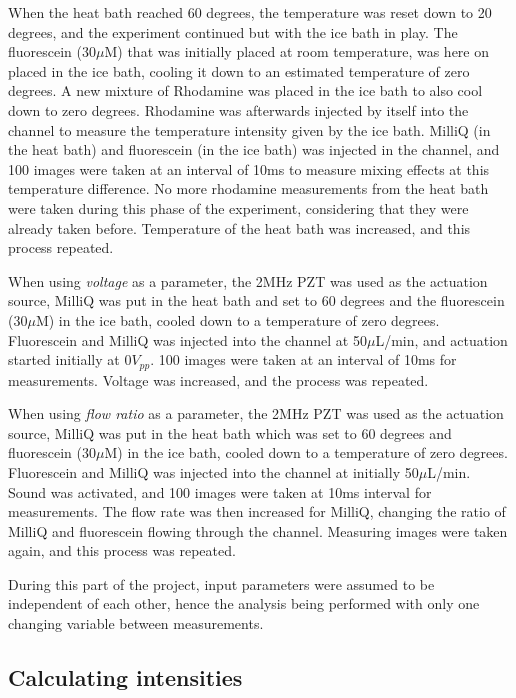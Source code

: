 \documentclass[twoside,twocolumn,9pt,a4paper]{IEEEtran}
\begin{document}
When the heat bath reached 60 degrees, the temperature was reset down to 20 degrees, and the experiment continued but with the ice bath in play. The fluorescein (30$\mu$M) that was initially placed at room temperature, was here on placed in the ice bath, cooling it down to an estimated temperature of zero degrees. A new mixture of Rhodamine was placed in the ice bath to also cool down to zero degrees. Rhodamine was afterwards injected by itself into the channel to measure the temperature intensity given by the ice bath. MilliQ (in the heat bath) and fluorescein (in the ice bath) was injected in the channel, and 100 images were taken at an interval of 10ms to measure mixing effects at this temperature difference. No more rhodamine measurements from the heat bath were taken during this phase of the experiment, considering that they were already taken before. Temperature of the heat bath was increased, and this process repeated.

When using \textit{voltage} as a parameter, the 2MHz PZT was used as the actuation source, MilliQ was put in the heat bath and set to 60 degrees and the fluorescein (30$\mu$M) in the ice bath, cooled down to a temperature of zero degrees. Fluorescein and MilliQ was injected into the channel at 50$\mu$L/min, and actuation started initially at $0 V_{pp}$. 100 images were taken at an interval of 10ms for measurements. Voltage was increased, and the process was repeated. 

When using \textit{flow ratio} as a parameter, the 2MHz PZT was used as the actuation source, MilliQ was put in the heat bath which was set to 60 degrees and fluorescein (30$\mu$M) in the ice bath, cooled down to a temperature of zero degrees. Fluorescein and MilliQ was injected into the channel at initially 50$\mu$L/min. Sound was activated, and 100 images were taken at 10ms interval for measurements. The flow rate was then increased for MilliQ, changing the ratio of MilliQ and fluorescein flowing through the channel. Measuring images were taken again, and this process was repeated.

During this part of the project, input parameters were assumed to be independent of each other, hence the analysis being performed with only one changing variable between measurements.

\subsection{Calculating intensities}
\label{CAI}
\end{document}
